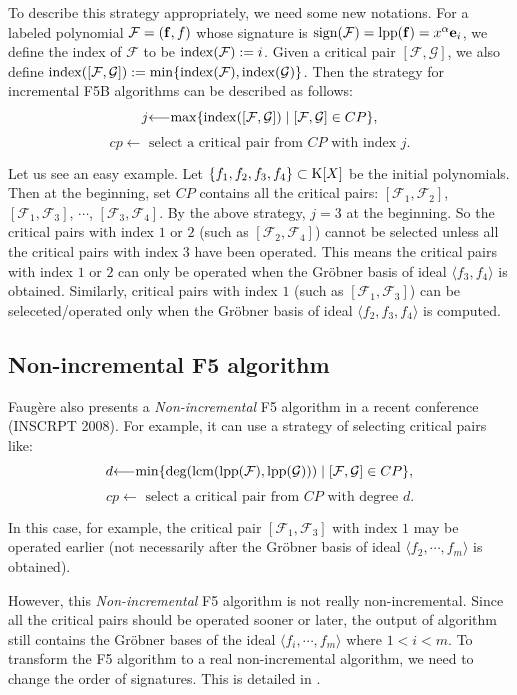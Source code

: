 \documentclass[preprint,authoryear,3p,12pt]{elsarticle}
\def\K{{\rm K}}
\def\lpp{{\rm lpp}}
\def\fb{{\bf f}}
\def\eb{{\bf e}}
\def\lcm{{\rm lcm}}
\def\deg{{\rm deg}}
\def\ind{{\rm index}}
\def\max{{\rm max}}
\def\min{{\rm min}}
\def\gr{{Gr\"obner }}
\def\s{{\rm{sign}}}
\def\lla{{\longleftarrow}}
\begin{document}
To describe this strategy appropriately, we need some new
notations. For a labeled polynomial ${\mathcal F}=(\fb, f)$ whose
signature is $\s({\mathcal F})=\lpp(\fb)=x^\alpha \eb_i$, we
define the index of ${\mathcal F}$ to be $\ind({\mathcal F}):=i$.
Given a critical pair $[{\mathcal F}, {\mathcal G}]$, we also
define $\ind([{\mathcal F}, {\mathcal G}]):=\min\{\ind({\mathcal
F}), \ind({\mathcal G})\}$. Then the strategy for incremental F5B
algorithms can be described as follows:
$$j \lla \max\{\ind([{\mathcal F}, {\mathcal
G}])\mid [{\mathcal F}, {\mathcal G}]\in CP\},$$
$$cp \lla \mbox{ select a critical
pair from } CP \mbox{ with index } j.$$

Let us see an easy example. Let $\{f_1, f_2, f_3, f_4\}\subset
\K[X]$ be the initial polynomials. Then at the beginning, set $CP$
contains all the critical pairs: $[{\mathcal F}_1, {\mathcal F}_2]$,
$[{\mathcal F}_1, {\mathcal F}_3]$, $\cdots$, $[{\mathcal F}_3,
{\mathcal F}_4]$. By the above strategy, $j=3$ at the beginning. So
the critical pairs with index $1$ or $2$ (such as $[{\mathcal F}_2,
{\mathcal F}_4]$) cannot be selected unless all the critical pairs
with index $3$ have been operated. This means the critical pairs
with index $1$ or $2$ can only be operated when the \gr basis of
ideal $\langle f_3, f_4\rangle$ is obtained. Similarly, critical
pairs with index $1$ (such as $[{\mathcal F}_1, {\mathcal F}_3]$)
can be seleceted/operated only when the \gr basis of ideal $\langle
f_2, f_3, f_4\rangle$ is computed.



\subsection{Non-incremental F5 algorithm}

Faug\`ere also presents a {\em Non-incremental} F5 algorithm in a
recent
conference (INSCRPT 2008). %
For example, it can use a strategy of selecting critical pairs like:
$$d \lla \min\{\deg(\lcm(\lpp({\mathcal F}), \lpp({\mathcal
G})))\mid [{\mathcal F}, {\mathcal G}]\in CP\},$$
$$cp \lla \mbox{ select a critical
pair from } CP \mbox{ with degree } d.$$

In this case, for example, the critical pair $[{\mathcal F}_1,
{\mathcal F}_3]$ with index $1$ may be operated earlier (not
necessarily after the \gr basis of ideal $\langle f_2, \cdots,
f_m\rangle$ is obtained).

However, this {\em Non-incremental} F5 algorithm is not really
non-incremental. Since all the critical pairs should be operated
sooner or later, the output of algorithm still contains the \gr
bases of the ideal $\langle f_i, \cdots, f_m\rangle$ where $1<i<m$.
To transform the F5 algorithm to a real non-incremental algorithm,
we need to change the order of signatures. This is detailed in
\citep{Ars09, SunWang10}.
\end{document}
